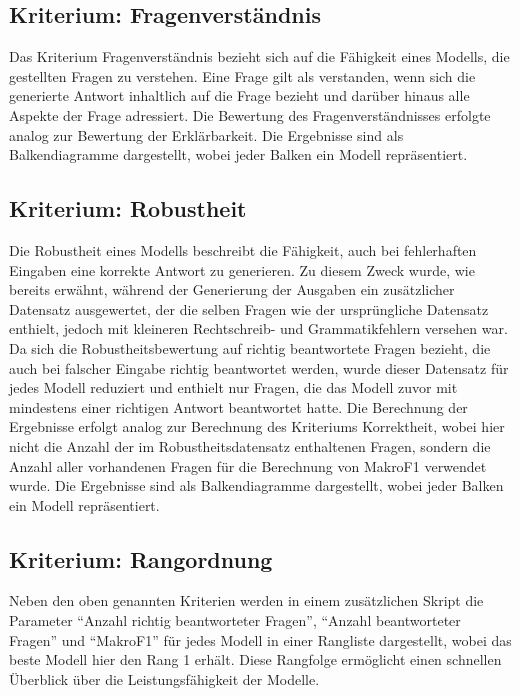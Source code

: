 \subsection{Kriterium: Fragenverständnis}
Das Kriterium Fragenverständnis bezieht sich auf die Fähigkeit eines Modells, die gestellten Fragen zu verstehen.
Eine Frage gilt als verstanden, wenn sich die generierte Antwort inhaltlich auf die Frage bezieht und darüber hinaus alle Aspekte der Frage adressiert.
Die Bewertung des Fragenverständnisses erfolgte analog zur Bewertung der Erklärbarkeit.
Die Ergebnisse sind als Balkendiagramme dargestellt, wobei jeder Balken ein Modell repräsentiert.\\

\subsection{Kriterium: Robustheit}
Die Robustheit eines Modells beschreibt die Fähigkeit, auch bei fehlerhaften Eingaben eine korrekte Antwort zu generieren.
Zu diesem Zweck wurde, wie bereits erwähnt, während der Generierung der Ausgaben ein zusätzlicher Datensatz ausgewertet, der die selben Fragen wie der ursprüngliche Datensatz enthielt, jedoch mit kleineren Rechtschreib- und Grammatikfehlern versehen war.
Da sich die Robustheitsbewertung auf richtig beantwortete Fragen bezieht, die auch bei falscher Eingabe richtig beantwortet werden, wurde dieser Datensatz für jedes Modell reduziert und enthielt nur Fragen, die das Modell zuvor mit mindestens einer richtigen Antwort beantwortet hatte.
Die Berechnung der Ergebnisse erfolgt analog zur Berechnung des Kriteriums Korrektheit, wobei hier nicht die Anzahl der im Robustheitsdatensatz enthaltenen Fragen, sondern die Anzahl aller vorhandenen Fragen für die Berechnung von MakroF1 verwendet wurde.
Die Ergebnisse sind als Balkendiagramme dargestellt, wobei jeder Balken ein Modell repräsentiert.\\

\subsection{Kriterium: Rangordnung}
Neben den oben genannten Kriterien werden in einem zusätzlichen Skript die Parameter \enquote{Anzahl richtig beantworteter Fragen}, \enquote{Anzahl beantworteter Fragen} und \enquote{MakroF1} für jedes Modell in einer Rangliste dargestellt, wobei das beste Modell hier den Rang 1 erhält.
Diese Rangfolge ermöglicht einen schnellen Überblick über die Leistungsfähigkeit der Modelle.\\